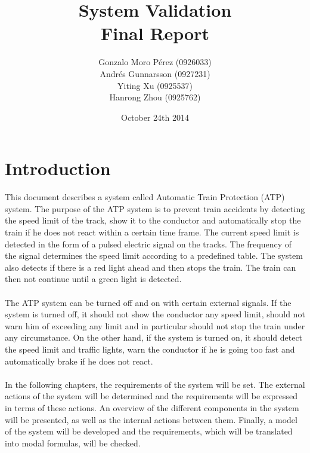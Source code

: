 \documentclass[11pt,a4paper]{article}
\begin{document}
\title{\Huge{\textbf{System Validation\\ Final Report\\[3cm]}}} %

\author{\LARGE{Gonzalo Moro P\'erez (0926033)}\\
	\LARGE{Andr\'es Gunnarsson (0927231)}\\
	\LARGE{Yiting Xu (0925537)}\\
	\LARGE{Hanrong Zhou (0925762)}\\[5cm]
	}

\date{\Large{October 24th 2014\\}}

\maketitle

\newpage


\tableofcontents



\newpage


\section{Introduction}

This document describes a system called Automatic Train Protection (ATP) system. The purpose of the ATP system is to prevent train accidents by detecting the speed limit of the track, show it to the conductor and automatically stop the train if he does not react within a certain time frame. The current speed limit is detected in the form of a pulsed electric signal on the tracks. The frequency of the signal determines the speed limit according to a predefined table. The system also detects if there is a red light ahead and then stops the train. The train can then not continue until a green light is detected. \\
\\
The ATP system can be turned off and on with certain external signals. If the system is turned off, it should not show the conductor any speed limit, should not warn him of exceeding any limit and in particular should not stop the train under any circumstance. On the other hand, if the system is turned on, it should detect the speed limit and traffic lights, warn the conductor if he is going too fast and automatically brake if he does not react. \\
\\
In the following chapters, the requirements of the system will be set. The external actions of the system will be determined and the requirements will be expressed in terms of these actions. An overview of the different components in the system will be presented, as well as the internal actions between them. Finally, a model of the system will be developed and the requirements, which will be translated into modal formulas, will be checked.
\end{document}
